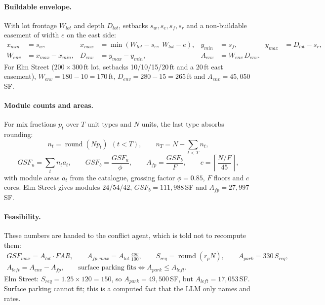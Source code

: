 \documentclass[10pt,a4paper]{article}
\theoremstyle{definition}
\begin{document}
\paragraph{Buildable envelope.} With lot frontage $W_{lot}$ and depth $D_{lot}$, setbacks $s_w, s_e, s_f, s_r$ and a
non-buildable easement of width $e$ on the east side:
\begin{align}
x_{min} &= s_w, & x_{max} &= \min(W_{lot}-s_e,\; W_{lot}-e), & y_{min} &= s_f, & y_{max} &= D_{lot}-s_r,\\
W_{env} &= x_{max}-x_{min}, & D_{env} &= y_{max}-y_{min}, & A_{env} &= W_{env}\,D_{env}.
\end{align}
For Elm Street ($200\times300$\,ft lot, setbacks 10/10/15/20\,ft and a 20\,ft east easement), $W_{env}=180-10=170$\,ft,
$D_{env}=280-15=265$\,ft and $A_{env}=45{,}050$\,SF.

\paragraph{Module counts and areas.} For mix fractions $p_t$ over $T$ unit types and $N$ units, the last type absorbs
rounding:
\begin{equation}
n_t=\operatorname{round}(N p_t)\ \ (t<T),\qquad n_T = N-\sum_{t<T} n_t,
\end{equation}
\begin{equation}
GSF_{u}=\sum_t n_t a_t,\qquad GSF_{b}=\frac{GSF_u}{\phi},\qquad A_{fp}=\frac{GSF_b}{F},\qquad
c=\left\lceil\frac{N/F}{45}\right\rceil ,
\end{equation}
with module areas $a_t$ from the catalogue, grossing factor $\phi=0.85$, $F$ floors and $c$ cores. Elm Street
gives modules $24/54/42$, $GSF_b=111{,}988$\,SF and $A_{fp}=27{,}997$\,SF.

\paragraph{Feasibility.} These numbers are handed to the conflict agent, which is told not to recompute them:
\begin{gather}
GSF_{max}=A_{lot}\cdot FAR,\qquad A_{fp,max}=A_{lot}\,\frac{cov}{100},\qquad S_{req}=\operatorname{round}(r_p N),\qquad A_{park}=330\,S_{req},\\
A_{left}=A_{env}-A_{fp},\qquad \text{surface parking fits}\iff A_{park}\le A_{left}.
\end{gather}
Elm Street: $S_{req}=1.25\times120=150$, so $A_{park}=49{,}500$\,SF, but $A_{left}=17{,}053$\,SF. Surface parking cannot
fit; this is a computed fact that the LLM only names and rates.
\end{document}
